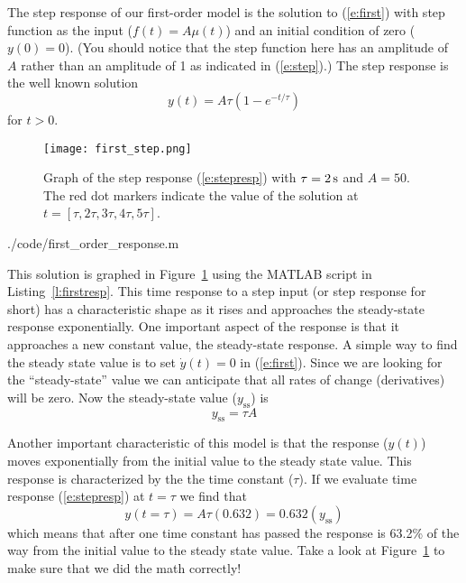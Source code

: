The \gls{step response} of our first-order model is the solution to (\ref{e:first}) with step function as the input ($f(t)=A\mu(t)$) and an initial condition of zero ($y(0)=0$).  (You should notice that the step function here has an amplitude of $A$ rather than an amplitude of 1 as indicated in (\ref{e:step}).)  The step response is the well known solution
\begin{equation}\label{e:stepresp}
y(t) = A\tau\left(1-e^{-t/\tau}\right)
\end{equation}
for $t>0$.

\begin{figure}[hbt]
\centering
\texttt{[image: first\_step.png]}
\caption{Graph of the step response (\ref{e:stepresp}) with $\tau=\unit[2]{s}$ and $A=50$.  The red dot markers indicate the value of the solution at $t=[\tau,2\tau,3\tau,4\tau,5\tau]$. }
\label{f:firststep}
\end{figure}



{./code/first_order_response.m}


This solution is graphed in Figure~\ref{f:firststep} using the MATLAB script in Listing~\ref{l:firstresp}. This time response to a step input (or step response for short) has a characteristic shape as it rises and approaches the \gls{steady-state response} exponentially.  One important aspect of the response is that it approaches a new constant value, the steady-state response.  A simple way to find the steady state value is to set $\dot{y}(t)=0$ in (\ref{e:first}).  Since we are looking for the ``steady-state'' value we can anticipate that all rates of change (derivatives) will be zero.  Now the steady-state value ($y_{\mathrm{ss}}$) is 
\begin{equation}\label{e:ss}
y_{\mathrm{ss}} = \tau A
\end{equation}

Another important characteristic of this model is that the response ($y(t)$) moves exponentially from the initial value to the steady state value.  This response is characterized by the the \gls{time constant} ($\tau$).  If we evaluate time response (\ref{e:stepresp}) at $t=\tau$ we find that
\[
y(t=\tau) = A \tau (0.632) = 0.632 (y_{\mathrm{ss}})
\]
which means that after one time constant has passed the response is 63.2\% of the way from the initial value to the steady state value.  Take a look at Figure~\ref{f:firststep} to make sure that we did the math correctly!

